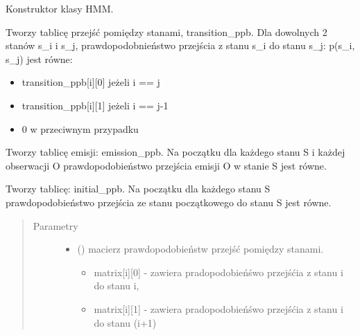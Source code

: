 \documentclass[letterpaper,10pt,polish]{sphinxmanual}
\begin{document}
\begin{fulllineitems}
\begin{quote}
\begin{description}
\begin{itemize}
\end{itemize}

\end{description}\end{quote}

\begin{fulllineitems}
\label{\detokenize{HMM:HMM.HMM.__init__}}
Konstruktor klasy HMM.

Tworzy tablicę przejść pomiędzy stanami, transition\_ppb.
Dla dowolnych 2 stanów s\_i i s\_j, prawdopodobnieństwo przejścia z stanu s\_i do stanu s\_j: p(s\_i, s\_j) jest równe:
\begin{itemize}
\item {} 
transition\_ppb{[}i{]}{[}0{]} jeżeli i == j

\item {} 
transition\_ppb{[}i{]}{[}1{]} jeżeli i == j-1

\item {} 
0 w przeciwnym przypadku

\end{itemize}

Tworzy tablicę emisji: emission\_ppb. Na początku dla każdego stanu S i każdej obserwacji O prawdopodobieństwo
przejścia emisji O w stanie S jest równe.

Tworzy tablicę: initial\_ppb. Na początku dla każdego stanu S prawdopodobieństwo przejścia ze stanu początkowego
do stanu S jest równe.
\begin{quote}\begin{description}
\item[{Parametry}] \leavevmode\begin{itemize}
\item {} 
 (\sphinxstyleliteralemphasis{{[}}\sphinxstyleliteralemphasis{{]}}\sphinxstyleliteralemphasis{{[}}\sphinxstyleliteralemphasis{{]}}) \textendash{} 
macierz prawdopodobieństw przejść pomiędzy stanami.
\begin{itemize}
\item {} 
matrix{[}i{]}{[}0{]} - zawiera pradopodobieńśwo przejśćia z stanu i do stanu i,

\item {} 
matrix{[}i{]}{[}1{]} - zawiera pradopodobieńśwo przejśćia z stanu i do stanu (i+1)


\end{itemize}
\end{itemize}
\end{description}
\end{quote}
\end{fulllineitems}
\end{fulllineitems}
\end{document}
